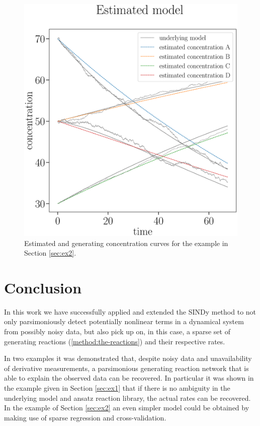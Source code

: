 \documentclass[oneside, abstracton, titlepage]{scrartcl}
\begin{document}
	\begin{figure}
		\begin{center}
			\includegraphics[width=.5\textwidth]{./figures_tex/cv_expected_estimated_concentrations}
		\end{center}
		\caption{Estimated and generating concentration curves for the example in Section \ref{sec:ex2}.}
		\label{ex2:result}
	\end{figure}
	
	\section{Conclusion}
	In this work we have successfully applied and extended the SINDy method to not only parsimoniously detect potentially nonlinear terms in a dynamical system from possibly noisy data, but also pick up on, in this case, a sparse set of generating reactions (\ref{method:the-reactions}) and their respective rates.
	
	In two examples it was demonstrated that, despite noisy data and unavailability of derivative measurements, a parsimonious generating reaction network that is able to explain the observed data can be recovered. 
	In particular it was shown in the example given in Section \ref{sec:ex1} that if there is no ambiguity in the underlying model and ansatz reaction library, the actual rates can be recovered. In the example of Section \ref{sec:ex2} an even simpler model could be obtained by making use of sparse regression and cross-validation.
	
	\newpage
% 	
	
	
	
\end{document}
